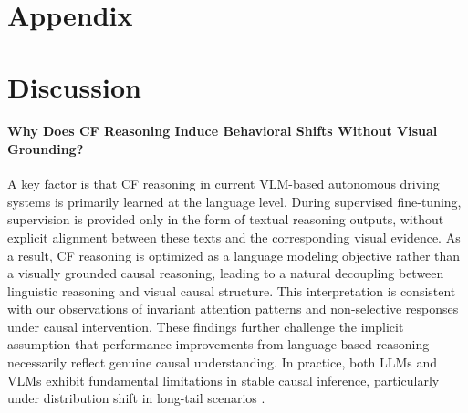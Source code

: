 \documentclass{article}
\begin{document}
\clearpage
\appendix

\renewcommand{\thesection}{\Alph{section}} %

\startcontents[appendix] %
\section*{Appendix} %
               {\setcounter{tocdepth}{2}} %

\clearpage

\section{Discussion}
\label{appendix:discussion}
\paragraph{Why Does CF Reasoning Induce Behavioral Shifts Without Visual Grounding?} A key factor is that CF reasoning in current VLM-based autonomous driving systems is primarily learned at the language level. During supervised fine-tuning, supervision is provided only in the form of textual reasoning outputs, without explicit alignment between these texts and the corresponding visual evidence. As a result, CF reasoning is optimized as a language modeling objective rather than a visually grounded causal reasoning, leading to a natural decoupling between linguistic reasoning and visual causal structure. This interpretation is consistent with our observations of invariant attention patterns and non-selective responses under causal intervention. These findings further challenge the implicit assumption that performance improvements from language-based reasoning necessarily reflect genuine causal understanding. In practice, both LLMs and VLMs exhibit fundamental limitations in stable causal inference, particularly under distribution shift in long-tail scenarios \cite{causal:whatif_tv_off?, causal:llm_cannot_discover_causality, dataset:fail2drive}. 
\end{document}
